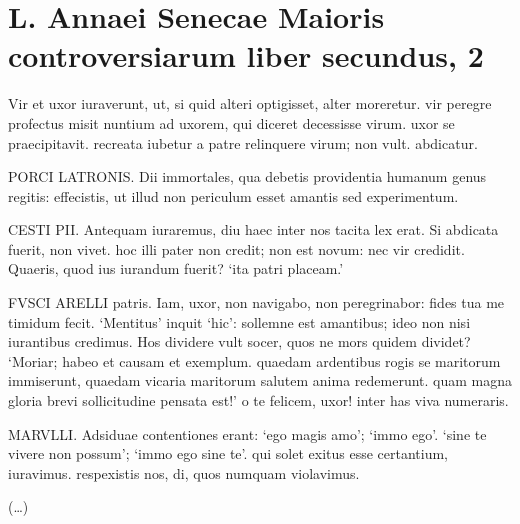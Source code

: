 
\section*{L. Annaei Senecae Maioris controversiarum liber secundus, 2}

Vir et uxor iuraverunt, ut, si quid alteri optigisset, alter moreretur. vir peregre profectus misit nuntium ad uxorem, qui diceret decessisse virum. uxor se praecipitavit. recreata iubetur a patre relinquere virum; non vult. abdicatur.

\medskip


PORCI LATRONIS. Dii immortales, qua debetis providentia humanum genus regitis: effecistis, ut illud non periculum esset amantis sed experimentum.

CESTI PII. Antequam iuraremus, diu haec inter nos tacita lex erat. Si abdicata fuerit, non vivet. hoc illi pater non credit; non est novum: nec vir credidit. Quaeris, quod ius iurandum fuerit? `ita patri placeam.'

FVSCI ARELLI patris. Iam, uxor, non navigabo, non peregrinabor: fides tua me timidum fecit. `Mentitus' inquit `hic': sollemne est amantibus; ideo non nisi iurantibus credimus. Hos dividere vult socer, quos ne mors quidem dividet? `Moriar; habeo et causam et exemplum. quaedam ardentibus rogis se maritorum immiserunt, quaedam vicaria maritorum salutem anima redemerunt. quam magna gloria brevi sollicitudine pensata est!' o te felicem, uxor! inter has viva numeraris.

MARVLLI. Adsiduae contentiones erant: `ego magis amo'; `immo ego'. `sine te vivere non possum'; `immo ego sine te'. qui solet exitus esse certantium, iuravimus. respexistis nos, di, quos numquam violavimus.

(\dots)

